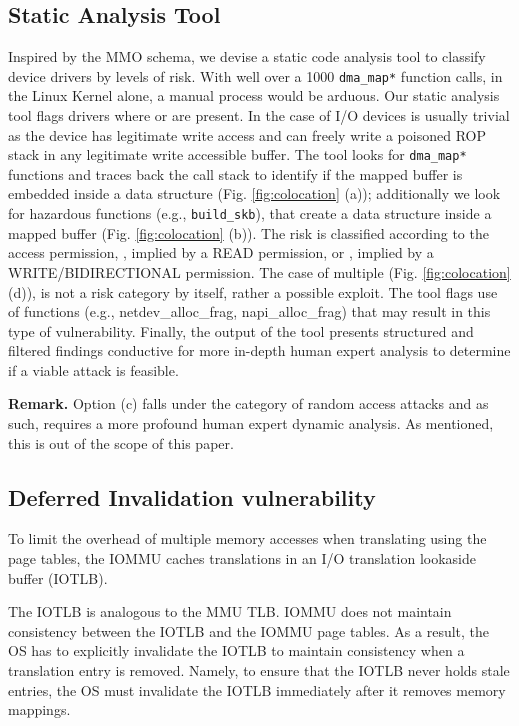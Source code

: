 \subsection{Static Analysis Tool}

Inspired by the MMO schema, we devise a static code analysis tool to classify device drivers by levels of risk. With well over a 1000 \texttt{dma\_map*} function calls, in the Linux Kernel alone, a manual process would be arduous.
Our static analysis tool flags drivers where \means{} or \oportunity{} are present. In the case of I/O devices \motivation{} is usually trivial as the device has legitimate write access and can freely write a poisoned ROP stack in any legitimate write accessible buffer. The tool looks for \texttt{dma\_map*} functions and traces back the call stack to identify if the mapped buffer is embedded inside a data structure (Fig. \ref{fig:colocation} (a)); additionally we look for hazardous functions (e.g., \texttt{build\_skb}), that create a data structure inside a mapped buffer (Fig. \ref{fig:colocation} (b)). The risk is classified according to the access permission, \motivation{}, implied by a READ permission, or \oportunity{} , implied by a WRITE/BIDIRECTIONAL permission. The case of multiple \iova{} (Fig. \ref{fig:colocation} (d)), is not a risk category by itself, rather a possible exploit. The tool flags use of functions (e.g., netdev\_alloc\_frag, napi\_alloc\_frag) that may result in this type of vulnerability.
Finally, the output of the tool presents structured and filtered findings conductive for more in-depth human expert analysis to determine if a viable attack is feasible. 

\noindent\textbf{Remark.} Option (c) falls under the category of random access attacks and as such, requires a more profound human expert dynamic analysis. As mentioned, this is out of the scope of this paper.


\subsection{Deferred Invalidation vulnerability} 

To limit the overhead of multiple memory accesses when translating \iova{} using the page tables, the IOMMU caches translations in an I/O translation lookaside buffer (IOTLB). 

The IOTLB is analogous to the MMU TLB. IOMMU does not maintain consistency between the IOTLB and the IOMMU page tables. As a result, the OS has to explicitly invalidate the IOTLB to maintain consistency when a translation entry is removed. Namely, to ensure that the IOTLB never holds stale entries, the OS must invalidate the IOTLB immediately after it removes memory mappings. 

